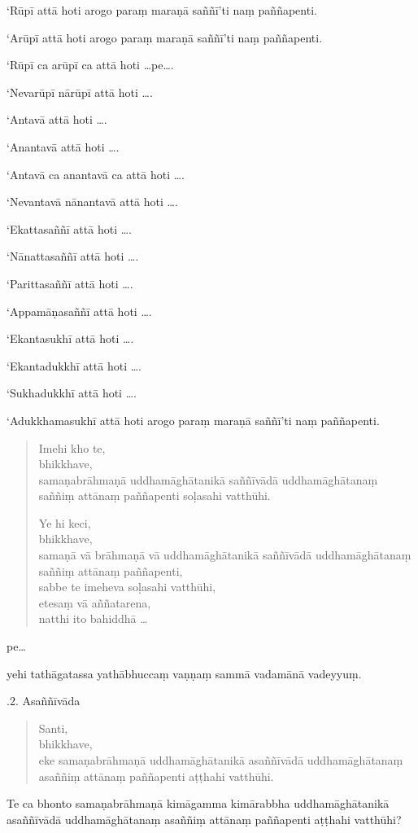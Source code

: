 \documentclass[11pt,twoside,openright]{book}
\begin{document}
\pstart
‘Rūpī attā hoti arogo paraṃ maraṇā saññī’ti naṃ paññapenti.
\pend

\pstart
‘Arūpī attā hoti arogo paraṃ maraṇā saññī’ti naṃ paññapenti.
\pend

\pstart
‘Rūpī ca arūpī ca attā hoti …pe….
\pend

\pstart
‘Nevarūpī nārūpī attā hoti ….
\pend

\pstart
‘Antavā attā hoti ….
\pend

\pstart
‘Anantavā attā hoti ….
\pend

\pstart
‘Antavā ca anantavā ca attā hoti ….
\pend

\pstart
‘Nevantavā nānantavā attā hoti ….
\pend

\pstart
‘Ekattasaññī attā hoti ….
\pend

\pstart
‘Nānattasaññī attā hoti ….
\pend

\pstart
‘Parittasaññī attā hoti ….
\pend

\pstart
‘Appamāṇasaññī attā hoti ….
\pend

\pstart
‘Ekantasukhī attā hoti ….
\pend

\pstart
‘Ekantadukkhī attā hoti ….
\pend

\pstart
‘Sukhadukkhī attā hoti ….
\pend

\pstart
‘Adukkhamasukhī attā hoti arogo paraṃ maraṇā saññī’ti naṃ paññapenti.
\pend

\begin{verse}
Imehi kho te,\\
\vin  bhikkhave,\\
\vin  samaṇabrāhmaṇā uddhamāghātanikā saññīvādā uddhamāghātanaṃ saññiṃ attānaṃ paññapenti soḷasahi vatthūhi.

Ye hi keci,\\
\vin  bhikkhave,\\
\vin  samaṇā vā brāhmaṇā vā uddhamāghātanikā saññīvādā uddhamāghātanaṃ saññiṃ attānaṃ paññapenti,\\
\vin  sabbe te imeheva soḷasahi vatthūhi,\\
\vin  etesaṃ vā aññatarena,\\
\vin  natthi ito bahiddhā …

\end{verse}
\pstart
pe…
\pend

\pstart
yehi tathāgatassa yathābhuccaṃ vaṇṇaṃ sammā vadamānā vadeyyuṃ.
\pend

.2. Asaññīvāda
\pend

\begin{verse}
Santi,\\
\vin  bhikkhave,\\
\vin  eke samaṇabrāhmaṇā uddhamāghātanikā asaññīvādā uddhamāghātanaṃ asaññiṃ attānaṃ paññapenti aṭṭhahi vatthūhi.

\end{verse}
\pstart
Te ca bhonto samaṇabrāhmaṇā kimāgamma kimārabbha uddhamāghātanikā asaññīvādā uddhamāghātanaṃ asaññiṃ attānaṃ paññapenti aṭṭhahi vatthūhi?
\pend
\end{document}
